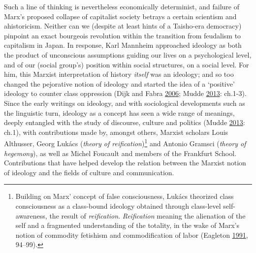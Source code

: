 \documentclass[10pt,british,A4paper,oneside]{memoir}
\begin{document}
Such a line of thinking is nevertheless economically determinist, and
failure of Marx's proposed collapse of capitalist society betrays a
certain scientism and ahistoricism. Neither can we (despite at least
hints of a Taisho-era democracy) pinpoint an exact bourgeois revolution
within the transition from feudalism to capitalism in Japan. In
response, Karl Mannheim approached ideology as both the product of
unconscious assumptions guiding our lives on a psychological level, and
of our (social group's) position within social structures, on a social
level. For him, this Marxist interpretation of history \emph{itself} was
an ideology; and so too changed the pejorative notion of ideology and
started the idea of a `positive' ideology to counter class oppression
(Dijk and Fabra \protect\hyperlink{ref-van_dijk_politics_2006}{2006};
Mudde \protect\hyperlink{ref-mudde_oxford_2013}{2013}: ch.1-3). Since
the early writings on ideology, and with sociological developments such
as the linguistic turn, ideology as a concept has seen a wide range of
meanings, deeply entangled with the study of discourse, culture and
politics (Mudde \protect\hyperlink{ref-mudde_oxford_2013}{2013}: ch.1),
with contributions made by, amongst others, Marxist scholars Louis
Althusser, Georg Lukács (\emph{theory of reification})\footnote{Building
  on Marx' concept of false consciousness, Lukács theorized class
  consciousness as a class-bound ideology obtained through class-level
  self-awareness, the result of \emph{reification}. \emph{Reification}
  meaning the alienation of the self and a fragmented understanding of
  the totality, in the wake of Marx's notion of commodity fetishism and
  commodification of labor (Eagleton
  \protect\hyperlink{ref-eagleton_ideology:_1991}{1991}, 94--99).} and
Antonio Gramsci (\emph{theory of hegemony}), as well as Michel Foucault
and members of the Frankfurt School. Contributions that have helped
develop the relation between the Marxist notion of ideology and the
fields of culture and communication.
\end{document}
